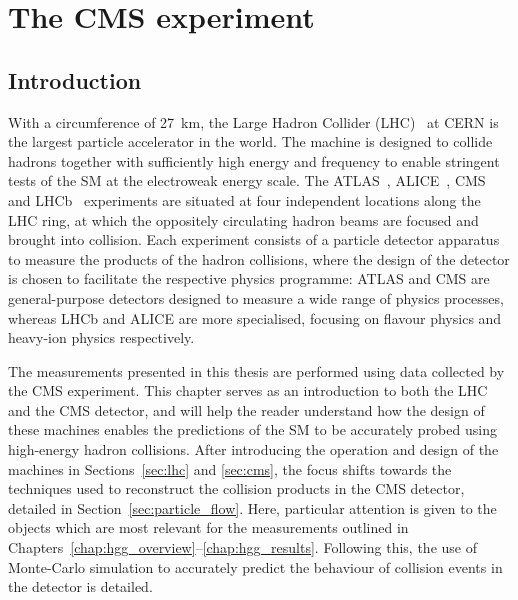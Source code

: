 \chapter{The CMS experiment}
\label{chap:cms}

\section{Introduction}
With a circumference of 27~km, the Large Hadron Collider (LHC)~\cite{1748-0221-3-08-S08001} at CERN is the largest particle accelerator in the world. The machine is designed to collide hadrons together with sufficiently high energy and frequency to enable stringent tests of the SM at the electroweak energy scale. The ATLAS~\cite{Aad:2008zzm}, ALICE~\cite{Aamodt:2008zz}, CMS~\cite{Chatrchyan:2008zzk} and LHCb~\cite{Alves:2008zz} experiments are situated at four independent locations along the LHC ring, at which the oppositely circulating hadron beams are focused and brought into collision. Each experiment consists of a particle detector apparatus to measure the products of the hadron collisions, where the design of the detector is chosen to facilitate the respective physics programme: ATLAS and CMS are general-purpose detectors designed to measure a wide range of physics processes, whereas LHCb and ALICE are more specialised, focusing on flavour physics and heavy-ion physics respectively. 

The measurements presented in this thesis are performed using data collected by the CMS experiment. This chapter serves as an introduction to both the LHC and the CMS detector, and will help the reader understand how the design of these machines enables the predictions of the SM to be accurately probed using high-energy hadron collisions. After introducing the operation and design of the machines in Sections~\ref{sec:lhc} and \ref{sec:cms}, the focus shifts towards the techniques used to reconstruct the collision products in the CMS detector, detailed in Section~\ref{sec:particle_flow}. Here, particular attention is given to the objects which are most relevant for the \Hgg measurements outlined in Chapters~\ref{chap:hgg_overview}--\ref{chap:hgg_results}. Following this, the use of Monte-Carlo simulation to accurately predict the behaviour of collision events in the detector is detailed. 

